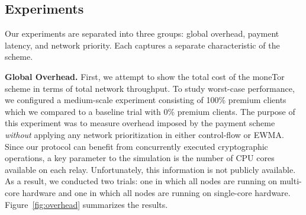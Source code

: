 \subsection{Experiments}

\label{subsec:experiments} Our experiments are separated into three groups: global overhead, payment latency, and network priority.
Each captures a separate characteristic of the scheme.

\medskip \noindent \textbf{Global Overhead.}
First, we attempt to show the total cost of the moneTor scheme in terms of total network throughput.
To study worst-case performance, we configured a medium-scale experiment consisting of 100\% premium clients which we compared to a baseline trial with 0\% premium clients.
The purpose of this experiment was to measure overhead imposed by the payment scheme \emph{without} applying any network prioritization in either control-flow or EWMA.
Since our protocol can benefit from concurrently executed cryptographic operations, a key parameter to the simulation is the number of CPU cores available on each relay.
Unfortunately, this information is not publicly available.
As a result, we conducted two trials: one in which all nodes are running on multi-core hardware and one in which all nodes are running on single-core hardware.
Figure~\ref{fig:overhead} summarizes the results.

